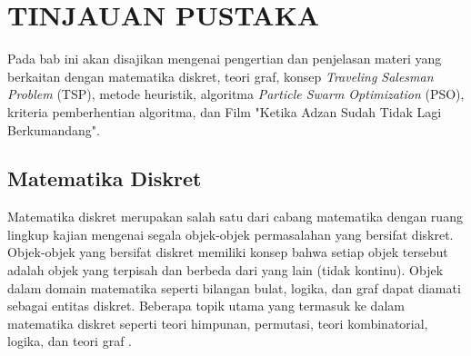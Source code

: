 \renewcommand{\thechapter}{\Roman{chapter}}
\chapter{TINJAUAN PUSTAKA}\label{babDua}
\renewcommand{\thechapter}{\arabic{chapter}}
\vspace{8mm}

{\frenchspacing
    Pada bab ini akan disajikan mengenai pengertian dan penjelasan materi yang berkaitan dengan matematika diskret, teori graf,
    konsep \textit{Traveling Salesman Problem} (TSP), metode heuristik, algoritma \textit{Particle Swarm Optimization} (PSO), kriteria pemberhentian algoritma,
    dan Film "Ketika Adzan Sudah Tidak Lagi Berkumandang".
}
\vspace{-3mm}

\section{Matematika Diskret}
\vspace{-4mm}
{\frenchspacing
    Matematika diskret merupakan salah satu dari cabang matematika dengan ruang lingkup kajian mengenai
    segala objek-objek permasalahan yang bersifat diskret.
    Objek-objek yang bersifat diskret memiliki konsep bahwa setiap objek tersebut adalah objek yang terpisah
    dan berbeda dari yang lain (tidak kontinu).
    Objek dalam domain matematika seperti bilangan bulat, logika, dan graf dapat diamati sebagai entitas diskret.
    Beberapa topik utama yang termasuk ke dalam matematika diskret seperti teori himpunan, permutasi, teori kombinatorial, logika, dan teori graf .
}
\vspace{-3mm}

